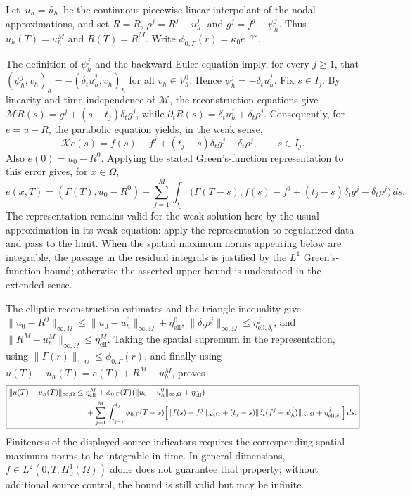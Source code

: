 \documentclass{article}
\begin{document}
Let \(\,u_h=\widetilde{u_h}\,\) be the continuous piecewise-linear interpolant of the nodal approximations, and set \(R=\widetilde R\), \(\rho^j=R^j-u_h^j\), and \(g^j=f^j+\psi_h^j\). Thus \(u_h(T)=u_h^M\) and \(R(T)=R^M\). Write \(\phi_{0,\Gamma}(r)=\kappa_0e^{-\gamma r}\).

The definition of \(\psi_h^j\) and the backward Euler equation imply, for every \(j\geq1\), that \((\psi_h^j,v_h)_h=-(\delta_tu_h^j,v_h)_h\) for all \(v_h\in V_h^0\). Hence \(\psi_h^j=-\delta_tu_h^j\). Fix \(s\in I_j\). By linearity and time independence of \(\mathcal M\), the reconstruction equations give \(\mathcal M R(s)=g^j+(s-t_j)\delta_tg^j\), while \(\partial_tR(s)=\delta_tu_h^j+\delta_t\rho^j\). Consequently, for \(e=u-R\), the parabolic equation yields, in the weak sense,
\[
\mathcal K e(s)=f(s)-f^j+(t_j-s)\delta_tg^j-\delta_t\rho^j,\qquad s\in I_j.
\]
Also \(e(0)=u_0-R^0\). Applying the stated Green's-function representation to this error gives, for \(x\in\Omega\),
\[
e(x,T)=(\Gamma(T),u_0-R^0)+\sum_{j=1}^M\int_{I_j}\bigl(\Gamma(T-s),f(s)-f^j+(t_j-s)\delta_tg^j-\delta_t\rho^j\bigr)\,ds.
\]
The representation remains valid for the weak solution here by the usual approximation in its weak equation: apply the representation to regularized data and pass to the limit. When the spatial maximum norms appearing below are integrable, the passage in the residual integrals is justified by the \(L^1\) Green's-function bound; otherwise the asserted upper bound is understood in the extended sense.

The elliptic reconstruction estimates and the triangle inequality give
\(\|u_0-R^0\|_{\infty,\Omega}\leq\|u_0-u_h^0\|_{\infty,\Omega}+\eta_{\mathrm{ell}}^0\), \(\|\delta_t\rho^j\|_{\infty,\Omega}\leq\eta_{\mathrm{ell},\delta_t}^j\), and \(\|R^M-u_h^M\|_{\infty,\Omega}\leq\eta_{\mathrm{ell}}^M\). Taking the spatial supremum in the representation, using \(\|\Gamma(r)\|_{1,\Omega}\leq\phi_{0,\Gamma}(r)\), and finally using \(u(T)-u_h(T)=e(T)+R^M-u_h^M\), proves
\[
\boxed{\begin{aligned}
\|u(T)-u_h(T)\|_{\infty,\Omega}\leq{}&\eta_{\mathrm{ell}}^M
+\phi_{0,\Gamma}(T)\bigl(\|u_0-u_h^0\|_{\infty,\Omega}+\eta_{\mathrm{ell}}^0\bigr)\\
&+\sum_{j=1}^M\int_{t_{j-1}}^{t_j}\phi_{0,\Gamma}(T-s)
\Bigl[\|f(s)-f^j\|_{\infty,\Omega}
+(t_j-s)\|\delta_t(f^j+\psi_h^j)\|_{\infty,\Omega}
+\eta_{\mathrm{ell},\delta_t}^j\Bigr] \,ds.
\end{aligned}}
\]
Finiteness of the displayed source indicators requires the corresponding spatial maximum norms to be integrable in time. In general dimensions, \(f\in L^2(0,T;H_0^1(\Omega))\) alone does not guarantee that property; without additional source control, the bound is still valid but may be infinite.
\end{document}
